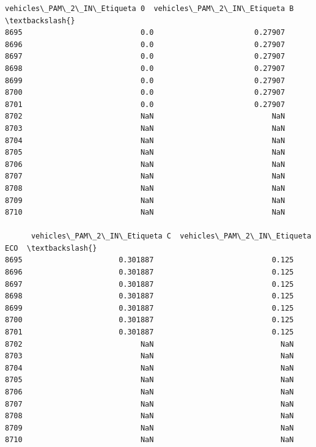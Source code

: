 \documentclass[11pt]{article}
\begin{document}
\begin{tcolorbox}[breakable, size=fbox, boxrule=.5pt, pad at break*=1mm, opacityfill=0]
\begin{Verbatim}[commandchars=\\\{\}]
      vehicles\_PAM\_2\_IN\_Etiqueta 0  vehicles\_PAM\_2\_IN\_Etiqueta B  \textbackslash{}
8695                           0.0                       0.27907
8696                           0.0                       0.27907
8697                           0.0                       0.27907
8698                           0.0                       0.27907
8699                           0.0                       0.27907
8700                           0.0                       0.27907
8701                           0.0                       0.27907
8702                           NaN                           NaN
8703                           NaN                           NaN
8704                           NaN                           NaN
8705                           NaN                           NaN
8706                           NaN                           NaN
8707                           NaN                           NaN
8708                           NaN                           NaN
8709                           NaN                           NaN
8710                           NaN                           NaN

      vehicles\_PAM\_2\_IN\_Etiqueta C  vehicles\_PAM\_2\_IN\_Etiqueta ECO  \textbackslash{}
8695                      0.301887                           0.125
8696                      0.301887                           0.125
8697                      0.301887                           0.125
8698                      0.301887                           0.125
8699                      0.301887                           0.125
8700                      0.301887                           0.125
8701                      0.301887                           0.125
8702                           NaN                             NaN
8703                           NaN                             NaN
8704                           NaN                             NaN
8705                           NaN                             NaN
8706                           NaN                             NaN
8707                           NaN                             NaN
8708                           NaN                             NaN
8709                           NaN                             NaN
8710                           NaN                             NaN


\end{Verbatim}
\end{tcolorbox}
\end{document}
